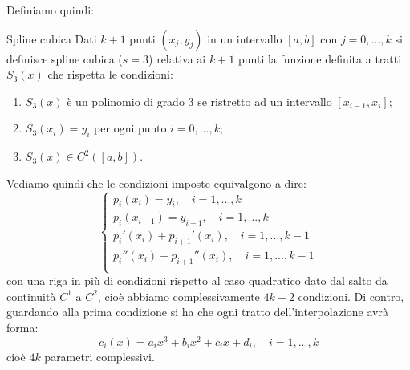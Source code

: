 \documentclass[a4paper,11pt]{article}
\begin{document}
Definiamo quindi:
\begin{definition}{Spline cubica}
	Dati $k + 1$ punti $(x_j, y_j)$ in un intervallo $[a, b]$ con $j = 0, ..., k$ si definisce spline cubica ($s = 3$) relativa ai $k + 1$ punti la funzione definita a tratti $S_3(x)$ che rispetta le condizioni:
	\begin{enumerate}
		\item $S_3(x)$ è un polinomio di grado 3 se ristretto ad un intervallo $[x_{i - 1}, x_i]$;
		\item $S_3(x_i) = y_i$ per ogni punto $i = 0, ..., k$;
		\item $S_3(x) \in C^2([a, b])$.
	\end{enumerate}
\end{definition}
Vediamo quindi che le condizioni imposte equivalgono a dire:
\[
	\begin{cases}
		p_i(x_i) = y_i, \quad i = 1, ..., k \\ 
		p_i(x_{i - 1}) = y_{i - 1}, \quad i = 1, ..., k \\ 
		p_i'(x_i) + p_{i + 1}'(x_i), \quad i = 1, ..., k - 1 \\ 
		p_i''(x_i) + p_{i + 1}''(x_i), \quad i = 1, ..., k - 1 \\ 
	\end{cases}
\]
con una riga in più di condizioni rispetto al caso quadratico dato dal salto da continuità $C^1$ a $C^2$, cioè abbiamo complessivamente $4k - 2$ condizioni.
Di contro, guardando alla prima condizione si ha che ogni tratto dell'interpolazione avrà forma:
$$
c_i(x) = a_i x^3 + b_i x^2 + c_i x + d_i, \quad i = 1, ..., k
$$
cioè $4k$ parametri complessivi.
\end{document}

